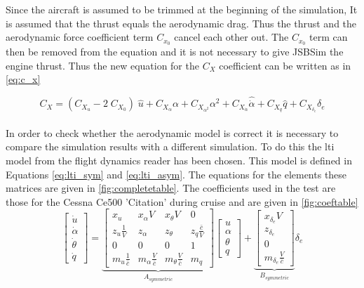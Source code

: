 Since the aircraft is assumed to be trimmed at the beginning of the simulation, It is assumed that the thrust equals the aerodynamic drag. Thus the thrust and the aerodynamic force coefficient term $C_{x_0}$ cancel each other out. The $C_{x_0}$ term can then be removed from the equation and it is not necessary to give JSBSim the engine thrust. Thus the new equation for the $C_X$ coefficient can be written as in \autoref{eq:c_x}

\begin{equation}
\label{eq:c_x}
{C_X} = ({C_{{X_u}}} - 2\;{C_{{X_0}}})\;\hat u + {C_{{X_\alpha }}}\alpha  + {C_{{X_{{\alpha ^2}}}}}{\alpha ^2} + C_{{X_{\dot{\alpha}}}}\hat{\dot{\alpha}}  + {C_{{X_q}}}\hat q + {C_{{X_{{\delta _e}}}}}{\delta _e}
\end{equation}\\

In order to check whether the aerodynamic model is correct it is necessary to compare the simulation results with a different simulation. To do this the \gls{lti} model from the flight dynamics reader\cite{fdreader} has been chosen. This model is defined in Equations \ref{eq:lti_sym} and \ref{eq:lti_asym}. The equations for the elements these matrices are given in \autoref{fig:completetable}. The coefficients used in the test are those for the Cessna Ce500 'Citation' during cruise and are given in \autoref{fig:coeftable}\\


\begin{equation}
\label{eq:lti_sym}
\left[ {\begin{array}{*{20}{c}}
    {\dot u} \\ 
    {\dot \alpha } \\ 
    {\dot \theta } \\ 
    {\dot q} 
\end{array}} \right] = \underbrace {\left[ {\begin{array}{*{20}{c}}
    {{x_u}}&{{x_\alpha }V}&{{x_\theta }V}&0 \\ 
    {{z_u}\tfrac{1}{V}}&{{z_\alpha }}&{{z_\theta }}&{{z_q}\tfrac{{\bar c}}{V}} \\ 
    0&0&0&1 \\ 
    {{m_u}\tfrac{1}{{\bar c}}}&{{m_\alpha }\tfrac{V}{{\bar c}}}&{{m_\theta }\tfrac{V}{{\bar c}}}&{{m_q}} 
\end{array}} \right]}_{{A_{symmetric}}}\left[ {\begin{array}{*{20}{c}}
    u \\ 
    \alpha  \\ 
    \theta  \\ 
    q 
\end{array}} \right] + \underbrace {\left[ {\begin{array}{*{20}{c}}
    {{x_{{\delta _e}}}V} \\ 
    {{z_{{\delta _e}}}} \\ 
    0 \\ 
    {{m_{{\delta _e}}}\tfrac{V}{{\bar c}}} 
\end{array}} \right]}_{{B_{symmetric}}}{\delta _e}
\end{equation}





